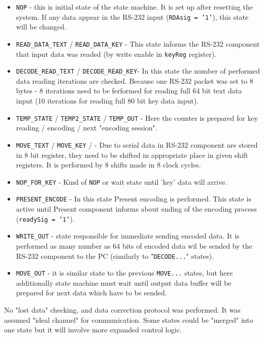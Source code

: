 \documentclass{gajewski}
\begin{document}
\begin{itemize}
    \item \texttt{NOP} - this is initial state of the state machine. It is set up after resetting the system. If any data appear in the RS-232 input (\texttt{RDAsig = '1'}), this state will be changed.
    \item \texttt{READ\_DATA\_TEXT} / \texttt{READ\_DATA\_KEY} - This state informs the RS-232 component that input data was readed (by write enable in \texttt{keyReg} register). 
    \item \texttt{DECODE\_READ\_TEXT} / \texttt{DECODE\_READ\_KEY}- In this state the number of performed data reading iterations are checked. Because one RS-232 packet was set to 8 bytes - 8 iterations need to be ferformed for reading full 64 bit text data input (10 iterations for reading full 80 bit key data input).
    \item \texttt{TEMP\_STATE} / \texttt{TEMP2\_STATE} / \texttt{TEMP\_OUT} - Here the counter is prepared for key reading / encoding / next "encoding session".
    \item \texttt{MOVE\_TEXT} / \texttt{MOVE\_KEY} / - Due to serial data in RS-232 component are stored in 8 bit register, they need to be shifted in appropriate place in given shift registers. It is performed by 8 shifts made in 8 clock cycles.
    \item \texttt{NOP\_FOR\_KEY} - Kind of \texttt{NOP} or wait state until 'key' data will arrive.
    \item \texttt{PRESENT\_ENCODE} - In this state Present encoding is performed. This state is active until Present component informs about ending of the encoding process (\texttt{readySig = '1'}).
    \item \texttt{WRITE\_OUT} - state responsible for immediate sending encoded data. It is performed as many number as 64 bits of encoded data wil be sended by the RS-232 component to the PC (similarly to "\texttt{DECODE...}" states). 
    \item \texttt{MOVE\_OUT} - it is similar state to the previous \texttt{MOVE...} states, but here additionally state machine must wait until output data buffer will be prepared for next data which have to be sended.
\end{itemize}
No "lost data" checking, and data correction protocol was performed. It was assumed "ideal channel" for communication. Some states could be "merged" into one state but it will involve more expanded control logic.

\newpage
\end{document}
